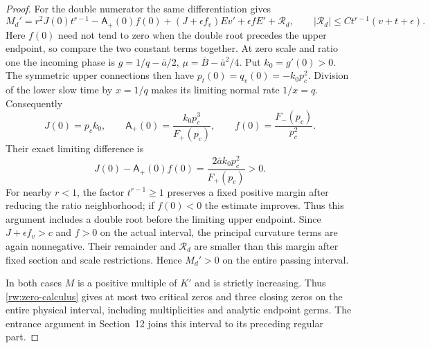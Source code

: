 \begin{proof}
For the double numerator the same differentiation gives
\[
 M_d'=r^2J(0)t^{r-1}-\mathsf A_+(0)f(0)
 +(J+\epsilon f_v)Ev'+\epsilon fE'+\mathcal R_d,
 \qquad |\mathcal R_d|\le Ct^{r-1}(v+t+\epsilon).
\]
Here $f(0)$ need not tend to zero when the double root precedes the
upper endpoint, so compare the two constant terms together.
At zero scale and ratio one the incoming phase is
$g=1/q-\bar a/2$, $\mu=\bar B-\bar a^2/4$.
Put $k_0=g'(0)>0$. The symmetric upper connections then have
$p_t(0)=q_v(0)=-k_0p_c^2$. Division of the lower slow time by
$x=1/q$ makes its limiting normal rate $1/x=q$.
Consequently
\[
 J(0)=p_ck_0,\qquad \mathsf A_+(0)=\frac{k_0p_c^3}{F_+(p_c)},
 \qquad f(0)=\frac{F_-(p_c)}{p_c^2}.
\]
Their exact limiting difference is
\begin{equation}\label{rw:finite:upper-double-gap}
 J(0)-\mathsf A_+(0)f(0)
       =\frac{2\bar a k_0p_c^2}{F_+(p_c)}>0.
\end{equation}
For nearby $r<1$, the factor $t^{r-1}\ge1$ preserves a fixed
positive margin after reducing the ratio neighborhood; if $f(0)<0$
the estimate improves. Thus this argument includes a double root
before the limiting upper endpoint. Since $J+\epsilon f_v>c$
and $f>0$ on the actual interval, the principal curvature terms are
again nonnegative. Their remainder and $\mathcal R_d$ are smaller
than this margin after fixed section and scale restrictions. Hence
$M_d'>0$ on the entire passing interval.

In both cases $M$ is a positive multiple of $K'$ and is strictly
increasing. Thus \ref{rw:zero-calculus} gives at most two critical
zeros and three closing zeros on the entire physical interval, including
multiplicities and analytic endpoint germs. The entrance argument in
Section~12 joins this interval to its preceding regular part.
\end{proof}
